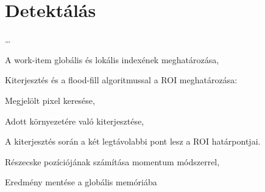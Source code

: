 \section{Detektálás}
\dots
	\begin{enumerate*}
		\item A work-item globális és lokális indexének meghatározása,
		\item Kiterjesztés és a flood-fill algoritmussal a ROI meghatározása:
		\begin{enumerate*}
			\item Megjelölt pixel keresése,
			\item Adott környezetére való kiterjesztése,
			\item A kiterjesztés során a két legtávolabbi pont lesz a ROI határpontjai.
		\end{enumerate*}
		\item Részecske pozíciójának számítása momentum módszerrel,
		\item Eredmény mentése a globális memóriába
	\end{enumerate*}

